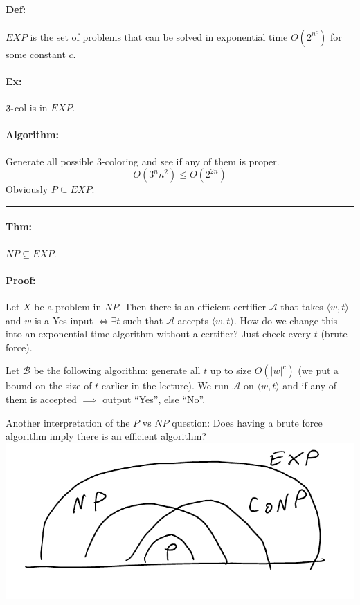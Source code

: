 \documentclass[12 pt]{article}
\begin{document}
          \paragraph{Def:} $EXP$ is the set of problems that can be
          solved in exponential time $O(2^{n^c})$ for some constant
          $c$.
          \paragraph{Ex:} $3 \hbox{-}$col is in $EXP$.
          \paragraph{Algorithm:} Generate all possible 3-coloring and
          see if any of them is proper.
          $$O(3^n n^2) \leq O(2^{2n})$$
          Obviously $P \subseteq EXP$.
          \\ \noindent \rule{\textwidth}{0.5pt}
          \paragraph{Thm:} $NP \subseteq EXP$.
          \paragraph{Proof:} Let $X$ be a problem in $NP$. Then there
          is an efficient certifier $\mathcal{A}$ that takes $\langle
          w , t \rangle$ and $w$ is a Yes input $\iff \exists t $
          such that $\mathcal{A}$ accepts $\langle w,t \rangle$. How
          do we change this into an exponential time algorithm without
          a certifier? Just check every $t$ (brute force).

          Let $\mathcal{B}$ be the following algorithm: generate all
          $t$ up to size $O(\left|w\right|^c)$ (we put a bound on the
          size of $t$ earlier in the lecture). We run $\mathcal{A}$
          on $\langle w , t \rangle$ and if any of them is accepted
          $\implies $ output ``Yes'', else ``No''.

          Another interpretation of the $P$ vs $NP$ question: Does having
          a brute force algorithm imply there is an efficient
          algorithm?
          \\ \includegraphics[width=.9\textwidth]{i119.pdf}
\end{document}
